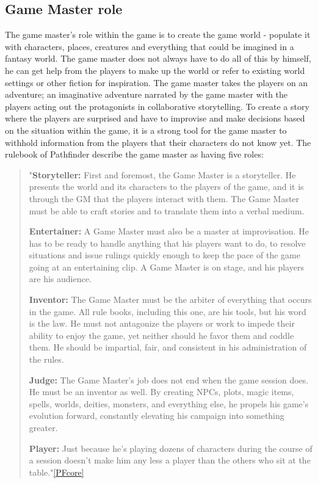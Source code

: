 \subsection*{Game Master role}
The game master's role within the game is to create the game world - populate it with characters, places, creatures and everything that could be imagined in a fantasy world. The game master does not always have to do all of this by himself, he can get help from the players to make up the world or refer to existing world settings or other fiction for inspiration. The game master takes the players on an adventure; an imaginative adventure narrated by the game master with the players acting out the protagonists in collaborative storytelling. To create a story where the players are surprised and have to improvise and make decisions based on the situation within the game, it is a strong tool for the game master to withhold information from the players that their characters do not know yet.
The rulebook of Pathfinder describe the game master as having five roles:
\begin{quote}
"\textbf{Storyteller:} First and foremost, the Game Master is a storyteller. He presents the world and its characters to the players of the game, and it is through the GM that the players interact with them. The Game Master must be able to craft stories and to translate them into a verbal medium.

\textbf{Entertainer:} A Game Master must also be a master at improvisation. He has to be ready to handle anything that his players want to do, to resolve situations and issue rulings quickly enough to keep the pace of the game going at an entertaining clip. A Game Master is on stage, and his players are his audience.

\textbf{Inventor:} The Game Master must be the arbiter of everything that occurs in the game. All rule books, including this one, are his tools, but his word is the law. He must not antagonize the players or work to impede their ability to enjoy the game, yet neither should he favor them and coddle them. He should be impartial, fair, and consistent in his administration of the rules.

\textbf{Judge:} The Game Master's job does not end when the game session does. He must be an inventor as well. By creating NPCs, plots, magic items, spells, worlds, deities, monsters, and everything else, he propels his game's evolution forward, constantly elevating his campaign into something greater.

\textbf{Player:} Just because he's playing dozens of characters during the course of a session doesn't make him any less a player than the others who sit at the table."\ref{PFcore}

\end{quote}

